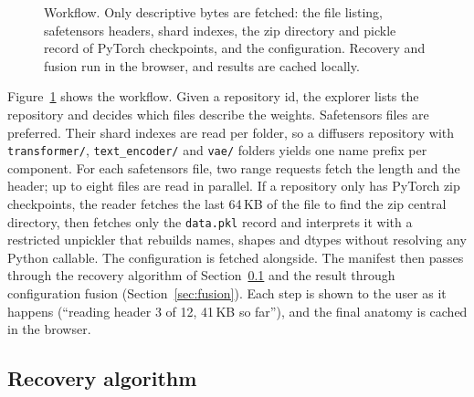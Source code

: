 \documentclass[11pt]{article}
\newcommand{\tn}[1]{\texttt{#1}}
\begin{document}
\begin{figure}[t]
\caption{Workflow. Only descriptive bytes are fetched: the file listing, safetensors headers, shard indexes, the zip directory and pickle record of PyTorch checkpoints, and the configuration. Recovery and fusion run in the browser, and results are cached locally.}
\label{fig:workflow}
\end{figure}

Figure~\ref{fig:workflow} shows the workflow. Given a repository id, the explorer lists the repository and decides which files describe the weights. Safetensors files are preferred. Their shard indexes are read per folder, so a diffusers repository with \tn{transformer/}, \tn{text\_encoder/} and \tn{vae/} folders yields one name prefix per component. For each safetensors file, two range requests fetch the length and the header; up to eight files are read in parallel. If a repository only has PyTorch zip checkpoints, the reader fetches the last 64\,KB of the file to find the zip central directory, then fetches only the \tn{data.pkl} record and interprets it with a restricted unpickler that rebuilds names, shapes and dtypes without resolving any Python callable. The configuration is fetched alongside. The manifest then passes through the recovery algorithm of Section~\ref{sec:recovery} and the result through configuration fusion (Section~\ref{sec:fusion}). Each step is shown to the user as it happens (``reading header 3 of 12, 41\,KB so far''), and the final anatomy is cached in the browser.

\subsection{Recovery algorithm}
\label{sec:recovery}
\end{document}

